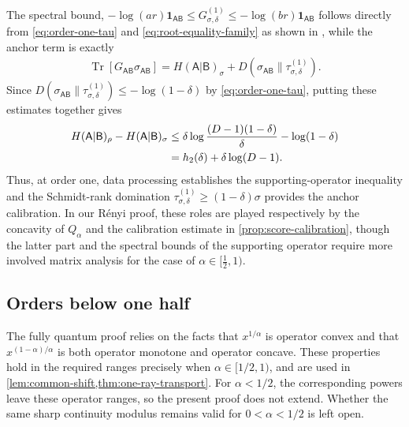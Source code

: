 \documentclass[11pt,reqno]{amsart}
\theoremstyle{definition}
\DeclareMathOperator{\Tr}{Tr}
\newcommand{\I}{\mathbf 1}
\newcommand{\A}{\mathsf{A}}
\newcommand{\B}{\mathsf{B}}
\begin{document}
The spectral bound, \(-\log(ar) \I_{\A\B} \leq G_{\sigma,\delta}^{(1)}\leq -\log (br) \I_{\A\B}\) follows directly from \cref{eq:order-one-tau} and \cref{eq:root-equality-family} as shown in \cite{BertaEtAl2026}, 
while the anchor term is exactly
\begin{align}
    \Tr\!\left[
        G_{\A\B} \sigma_{\A\B}
    \right]
    = H(\A|\B)_{\sigma} + D\!\left(
        \sigma_{\A\B}\big\|\tau_{\sigma,\delta}^{(1)}
    \right).
\end{align}
Since 
$D\!\left(
        \sigma_{\A\B}\big\|\tau_{\sigma,\delta}^{(1)}
    \right) \leq -\log (1-\delta)$ by \cref{eq:order-one-tau}, putting these estimates together gives
\begin{align}
    H(\A|\B)_\rho-H(\A|\B)_\sigma
    &\leq
    \delta\log
    \frac{(D-1)(1-\delta)}{\delta}
    -\log(1-\delta)
    \notag\\
    &=
    h_2(\delta)+\delta\log(D-1).
\end{align}
Thus, at order one, data processing establishes the supporting-operator
inequality and the Schmidt-rank domination
\(\tau_{\sigma,\delta}^{(1)}\geq(1-\delta)\sigma\) provides the anchor
calibration.  
In our R\'enyi proof, these roles are played respectively by
the concavity of \(Q_\alpha\) and the calibration estimate in
\cref{prop:score-calibration}, though the latter part and the spectral bounds of the supporting operator
require more involved matrix analysis for the case of $\alpha \in [\frac12,1)$.

\subsection{Orders below one half}
The fully quantum proof relies on the facts that
\(x^{1/\alpha}\) is operator convex and that
\(x^{(1-\alpha)/\alpha}\) is both operator monotone and operator concave.
These properties hold in the required ranges precisely when
\(\alpha\in[1/2,1)\), and are used in
\cref{lem:common-shift,thm:one-ray-transport}.
For \(\alpha<1/2\), the corresponding powers leave these operator ranges,
so the present proof does not extend.  
Whether the same sharp continuity
modulus remains valid for \(0<\alpha<1/2\) is left open.
\end{document}
